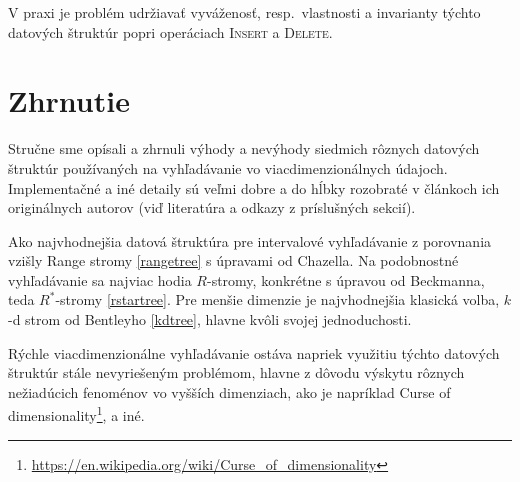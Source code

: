\documentclass[12pt,a4paper,oneside]{article}
\begin{document}
{V praxi je problém udržiavať vyváženosť, resp.~vlastnosti a invarianty týchto datových štruktúr popri operáciach \textsc{Insert} a \textsc{Delete}.

\section{Zhrnutie}

Stručne sme opísali a zhrnuli výhody a nevýhody siedmich rôznych datových štruktúr používaných na vyhľadávanie vo viacdimenzionálnych údajoch. Implementačné a iné detaily sú veľmi dobre a do hĺbky rozobraté v článkoch ich originálnych autorov (viď literatúra a odkazy z príslušných sekcií).

Ako najvhodnejšia datová štruktúra pre intervalové vyhľadávanie z porovnania vzišly Range stromy \ref{rangetree} s úpravami od Chazella. Na podobnostné vyhľadávanie sa najviac hodia $R$-stromy, konkrétne s úpravou od Beckmanna, teda $R^*$-stromy \ref{rstartree}. Pre menšie dimenzie je najvhodnejšia klasická volba, $k$-d strom od Bentleyho \ref{kdtree}, hlavne kvôli svojej jednoduchosti.

Rýchle viacdimenzionálne vyhľadávanie ostáva napriek využitiu týchto datových štruktúr stále
nevyriešeným problémom, hlavne z dôvodu výskytu rôznych nežiadúcich fenoménov vo vyšších dimenziach, ako je napríklad Curse of dimensionality\footnote{\url{https://en.wikipedia.org/wiki/Curse_of_dimensionality}}, a iné.
}

{
\footnotesize %

}
\end{document}
